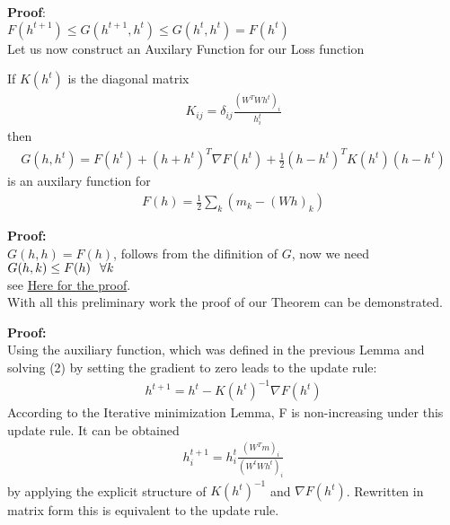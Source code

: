 \documentclass[aspectratio=169]{beamer}
\begin{document}
\begin{frame}
    \textbf{Proof}:\\
    $F(h^{t+1}) \leq G(h^{t+1}, h^{t}) \leq G(h^{t}, h^{t}) = F(h^{t})$\\
    Let us now construct an Auxilary Function for our Loss function
    \begin{lemma}
        If $K(h^{t})$ is the diagonal matrix
        \begin{align*}
            K_{ij} = \delta_{ij}\frac{(W^{T}Wh^{t})_{i}}{h_{i}^{t}}
        \end{align*}
        then 
        \begin{align}
            G(h, h^{t}) = F(h^{t}) + (h + h^{t})^{T}\nabla F(h^{t}) + \frac{1}{2}
            (h - h^{t})^{T}K(h^{t})(h - h^{t})
        \end{align}
        is an auxilary function for 
        \begin{align}
            F(h) = \frac{1}{2}\sum_{k}(m_{k} - (Wh)_{k})
        \end{align}
    \end{lemma}
\end{frame}
\begin{frame}
    \textbf{Proof:}\\
    $G(h, h) = F(h)$, follows from the difinition of $G$, now we need $G(h,k) \leq F(h) \hspace{0.1in} \forall k$\\
    see \href{https://proceedings.neurips.cc/paper/2000/file/f9d1152547c0bde01830b7e8bd60024c-Paper.pdf}
    {Here for the proof}.\\
    With all this preliminary work the proof of our Theorem  can be demonstrated.
\end{frame}
\begin{frame}
        \textbf{Proof:}\\
        Using the auxiliary function, which was defined in the previous Lemma and solving (2)
        by setting the gradient to zero leads to the update rule:
        \begin{align*}
            h^{t+1} = h^{t} - K(h^{t})^{-1}\nabla F(h^{t})
        \end{align*}
        According to the Iterative minimization Lemma, F is non-increasing under this update
        rule. It can be obtained
        \begin{align*}
            h^{t+1}_{i} = h^{t}_{i}\frac{(W^{T}m)_{i}}{(W^{t}Wh^{t})_{i}}
        \end{align*}
        by applying the explicit structure of $K(h^{t})^{-1}$ and $\nabla F(h^{t})$. Rewritten
        in matrix form this is equivalent to the update rule.
\end{frame}
\end{document}
